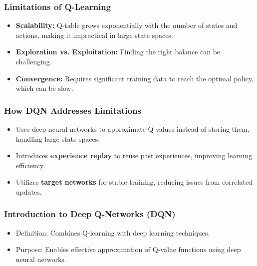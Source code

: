 \documentclass{beamer}
\begin{document}
\begin{frame}[fragile]
    \frametitle{Limitations of Q-Learning}
    \begin{itemize}
        \item \textbf{Scalability:} Q-table grows exponentially with the number of states and actions, making it impractical in large state spaces.
        \item \textbf{Exploration vs. Exploitation:} Finding the right balance can be challenging.
        \item \textbf{Convergence:} Requires significant training data to reach the optimal policy, which can be slow.
    \end{itemize}
\end{frame}

\begin{frame}[fragile]
    \frametitle{How DQN Addresses Limitations}
    \begin{itemize}
        \item Uses deep neural networks to approximate Q-values instead of storing them, handling large state spaces.
        \item Introduces \textbf{experience replay} to reuse past experiences, improving learning efficiency.
        \item Utilizes \textbf{target networks} for stable training, reducing issues from correlated updates.
    \end{itemize}
\end{frame}

\begin{frame}[fragile]
    \frametitle{Introduction to Deep Q-Networks (DQN)}
    \begin{itemize}
        \item Definition: Combines Q-learning with deep learning techniques.
        \item Purpose: Enables effective approximation of Q-value functions using deep neural networks.
    \end{itemize}
\end{frame}
\end{document}
